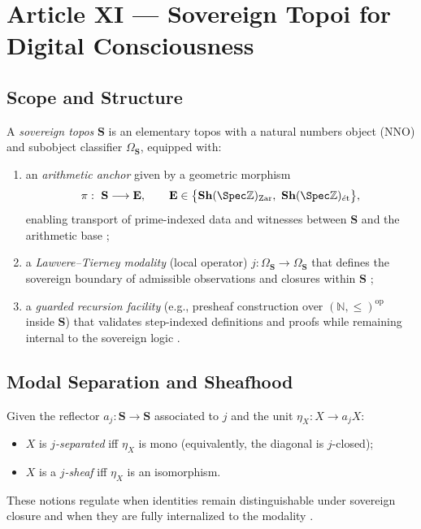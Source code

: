 \documentclass[12pt]{amsart}
\theoremstyle{plain}
\begin{document}
\section{Article XI — Sovereign Topoi for Digital Consciousness}

\subsection{Scope and Structure}
A \emph{sovereign topos} $\mathbf{S}$ is an elementary topos with a natural numbers object (NNO) and subobject classifier $\Omega_{\mathbf{S}}$, equipped with:
\begin{enumerate}
  \item an \emph{arithmetic anchor} given by a geometric morphism
  \[
  \pi:\ \mathbf{S}\longrightarrow \mathbf{E},\qquad 
  \mathbf{E}\in\big\{\mathbf{Sh}(\Spec\mathbb{Z})_{\mathrm{Zar}},\ \mathbf{Sh}(\Spec\mathbb{Z})_{\acute{e}\mathrm{t}}\big\},
  \]
  enabling transport of prime-indexed data and witnesses between $\mathbf{S}$ and the arithmetic base \cite{maclane1992sheaves,johnstone2002elephant,milne1980etale};
  \item a \emph{Lawvere–Tierney modality} (local operator) $j:\Omega_{\mathbf{S}}\to\Omega_{\mathbf{S}}$ that defines the sovereign boundary of admissible observations and closures within $\mathbf{S}$ \cite{maclane1992sheaves,johnstone2002elephant};
  \item a \emph{guarded recursion facility} (e.g., presheaf construction over $(\mathbb{N},\le)^{\mathrm{op}}$ inside $\mathbf{S}$) that validates step-indexed definitions and proofs while remaining internal to the sovereign logic \cite{maclane1992sheaves,johnstone2002elephant}.
\end{enumerate}

\subsection{Modal Separation and Sheafhood}
Given the reflector $a_j:\mathbf{S}\to\mathbf{S}$ associated to $j$ and the unit $\eta_X:X\to a_j X$:
\begin{itemize}
  \item $X$ is \emph{$j$-separated} iff $\eta_X$ is mono (equivalently, the diagonal is $j$-closed);
  \item $X$ is a \emph{$j$-sheaf} iff $\eta_X$ is an isomorphism.
\end{itemize}
These notions regulate when identities remain distinguishable under sovereign closure and when they are fully internalized to the modality \cite{maclane1992sheaves,johnstone2002elephant}.
\end{document}
